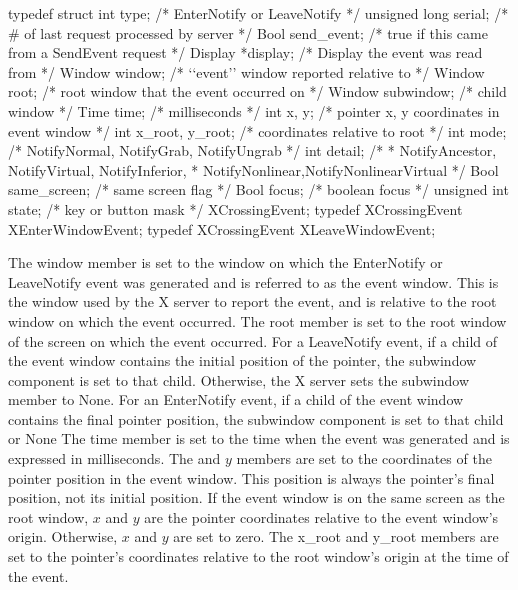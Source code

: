 \documentclass{report}
\begin{document}
\begin{itemize}
            \bigbreak \noindent 
            \begin{cppcode}
                typedef struct {
                    int type;               /* EnterNotify or LeaveNotify */
                    unsigned long serial;   /* # of last request processed by server */
                    Bool send_event;        /* true if this came from a SendEvent request */
                    Display *display;       /* Display the event was read from */
                    Window window;          /* ‘‘event’’ window reported relative to */
                    Window root;            /* root window that the event occurred on */
                    Window subwindow;       /* child window */
                    Time time;              /* milliseconds */
                    int x, y;               /* pointer x, y coordinates in event window */
                    int x_root, y_root;     /* coordinates relative to root */
                    int mode;               /* NotifyNormal, NotifyGrab, NotifyUngrab */
                    int detail;
                                            /*
                                            * NotifyAncestor, NotifyVirtual, NotifyInferior,
                                            * NotifyNonlinear,NotifyNonlinearVirtual
                                            */
                    Bool same_screen;       /* same screen flag */
                    Bool focus;             /* boolean focus */
                    unsigned int state;     /* key or button mask */
                } XCrossingEvent;
                typedef XCrossingEvent XEnterWindowEvent;
                typedef XCrossingEvent XLeaveWindowEvent;
            \end{cppcode}
            \bigbreak \noindent 
            The window member is set to the window on which the EnterNotify or LeaveNotify event was generated and is referred to as the event window. This is the window used by the X server to report the event, and is relative to the root window on which the event occurred. The root member is set to the root window of the screen on which the event occurred.
            \bigbreak \noindent 
            For a LeaveNotify event, if a child of the event window contains the initial position of the pointer, the subwindow component is set to that child. Otherwise, the X server sets the subwindow member to None. For an EnterNotify event, if a child of the event window contains the final pointer position, the subwindow component is set to that child or None
            \bigbreak \noindent 
            The time member is set to the time when the event was generated and is expressed in milliseconds. The and $y$ members are set to the coordinates of the pointer position in the event window. This position is always the pointer’s final position, not its initial position. If the event window is on the same screen as the root window, $x$ and $y$ are the pointer coordinates relative to the event window’s origin. Otherwise, $x$ and $y$ are set to zero. The x\_root and y\_root members are set to the pointer’s coordinates relative to the root window’s origin at the time of the event.

\end{itemize}
\end{document}
